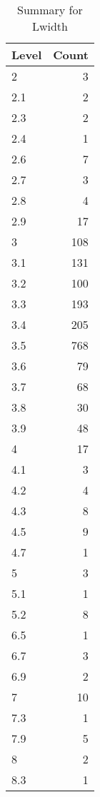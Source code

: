 \begin{table}[ht]
\centering
\begin{tabular}{lr}
  \hline
Level & Count \\ 
  \hline
2 &   3 \\ 
  2.1 &   2 \\ 
  2.3 &   2 \\ 
  2.4 &   1 \\ 
  2.6 &   7 \\ 
  2.7 &   3 \\ 
  2.8 &   4 \\ 
  2.9 &  17 \\ 
  3 & 108 \\ 
  3.1 & 131 \\ 
  3.2 & 100 \\ 
  3.3 & 193 \\ 
  3.4 & 205 \\ 
  3.5 & 768 \\ 
  3.6 &  79 \\ 
  3.7 &  68 \\ 
  3.8 &  30 \\ 
  3.9 &  48 \\ 
  4 &  17 \\ 
  4.1 &   3 \\ 
  4.2 &   4 \\ 
  4.3 &   8 \\ 
  4.5 &   9 \\ 
  4.7 &   1 \\ 
  5 &   3 \\ 
  5.1 &   1 \\ 
  5.2 &   8 \\ 
  6.5 &   1 \\ 
  6.7 &   3 \\ 
  6.9 &   2 \\ 
  7 &  10 \\ 
  7.3 &   1 \\ 
  7.9 &   5 \\ 
  8 &   2 \\ 
  8.3 &   1 \\ 
   \hline
\end{tabular}
\caption{Summary for Lwidth} 
\label{tab: Lwidth}
\end{table}
